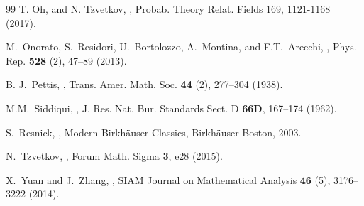\documentclass[a4paper,10pt,reqno]{article}
\theoremstyle{definition}
\theoremstyle{plain}
\theoremstyle{plain}
\theoremstyle{definition}
\theoremstyle{plain}
\theoremstyle{plain}
\theoremstyle{plain}
\theoremstyle{definition}
\theoremstyle{definition}
\begin{document}
{\begin{thebibliography}{99}
{\sc T. Oh, and N. Tzvetkov},  ,
\newblock Probab. Theory Relat. Fields 169, 1121-1168 (2017).

{\sc M.~Onorato, S.~Residori, U.~Bortolozzo, A.~Montina, and F.T.~Arecchi},
,
\newblock Phys. Rep. {\bf 528} (2), 47--89 (2013).

{\sc B. J.~Pettis},
,
\newblock Trans. Amer. Math. Soc. {\bf 44} (2), 277--304 (1938).

{\sc M.M.~Siddiqui},
,
\newblock J. Res. Nat. Bur. Standards Sect. D {\bf 66D}, 167--174 (1962).

{\sc S.~Resnick},
,
\newblock Modern Birkhäuser Classics, Birkhäuser Boston, 2003.

{\sc N.~Tzvetkov}, 
, 
Forum Math. Sigma {\bf 3}, e28 (2015).

{\sc X.~Yuan and J.~Zhang},
,
\newblock SIAM Journal on Mathematical Analysis {\bf 46} (5), 3176--3222 (2014).





\end{thebibliography}

}
\end{document}
